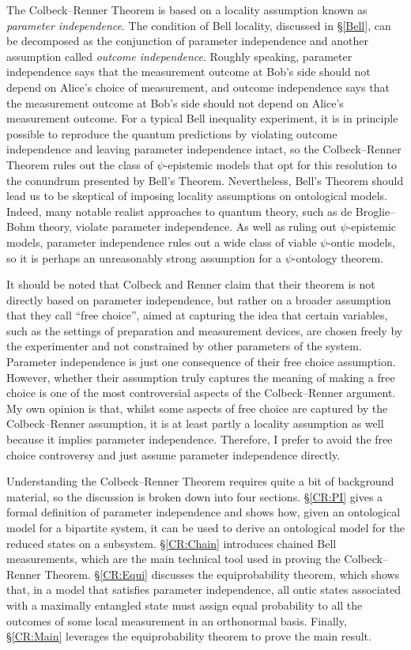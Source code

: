\documentclass[DIV=calc,paper=a4,fontsize=11pt,twocolumn]{scrartcl} %
\theoremstyle{definition}
\theoremstyle{plain}
\begin{document}
The Colbeck--Renner Theorem is based on a locality assumption known as
\emph{parameter independence}.  The condition of Bell locality,
discussed in \S\ref{Bell}, can be decomposed as the conjunction of
parameter independence and another assumption called \emph{outcome
independence}.  Roughly speaking, parameter independence says that
the measurement outcome at Bob's side should not depend on Alice's
choice of measurement, and outcome independence says that the
measurement outcome at Bob's side should not depend on Alice's
measurement outcome.  For a typical Bell inequality experiment, it is
in principle possible to reproduce the quantum predictions by
violating outcome independence and leaving parameter independence
intact, so the Colbeck--Renner Theorem rules out the class of
$\psi$-epistemic models that opt for this resolution to the conundrum
presented by Bell's Theorem.  Nevertheless, Bell's Theorem should lead
us to be skeptical of imposing locality assumptions on ontological
models.  Indeed, many notable realist approaches to quantum theory,
such as de Broglie--Bohm theory, violate parameter independence.  As
well as ruling out $\psi$-epistemic models, parameter independence
rules out a wide class of viable $\psi$-ontic models, so it is perhaps
an unreasonably strong assumption for a $\psi$-ontology theorem.

It should be noted that Colbeck and Renner claim that their theorem is
not directly based on parameter independence, but rather on a broader
assumption that they call ``free choice'', aimed at capturing the idea
that certain variables, such as the settings of preparation and
measurement devices, are chosen freely by the experimenter and not
constrained by other parameters of the system.  Parameter independence
is just one consequence of their free choice assumption.  However,
whether their assumption truly captures the meaning of making a free
choice is one of the most controversial aspects of the Colbeck--Renner
argument.  My own opinion is that, whilst some aspects of free choice
are captured by the Colbeck--Renner assumption, it is at least partly a
locality assumption as well because it implies parameter independence.
Therefore, I prefer to avoid the free choice controversy and just
assume parameter independence directly.

Understanding the Colbeck--Renner Theorem requires quite a bit of
background material, so the discussion is broken down into four
sections.  \S\ref{CR:PI} gives a formal definition of parameter
independence and shows how, given an ontological model for a bipartite
system, it can be used to derive an ontological model for the reduced
states on a subsystem.  \S\ref{CR:Chain} introduces chained Bell
measurements, which are the main technical tool used in proving the
Colbeck--Renner Theorem.  \S\ref{CR:Equi} discusses the equiprobability
theorem, which shows that, in a model that satisfies parameter
independence, all ontic states associated with a maximally entangled
state must assign equal probability to all the outcomes of some local
measurement in an orthonormal basis.  Finally, \S\ref{CR:Main}
leverages the equiprobability theorem to prove the main result.
\end{document}
